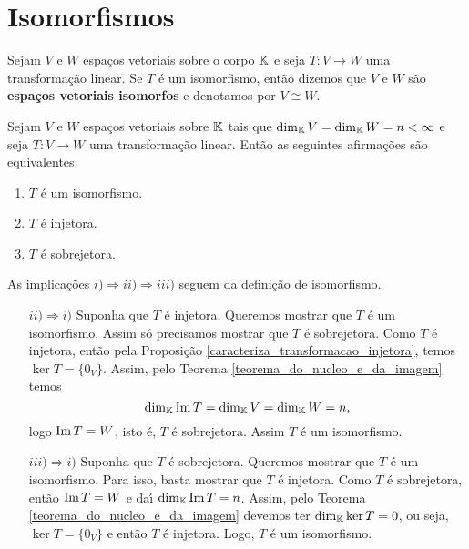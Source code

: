 \section{Isomorfismos}

\begin{definicao}
  Sejam $V$ e $W$ espa\c{c}os vetoriais sobre o corpo $\mathbb{K}$ e seja $T : V \to W$ uma transforma\c{c}\~ao linear. Se $T$ \'e um isomorfismo, ent\~ao dizemos que $V$ e $W$ s\~ao \textbf{espa\c{c}os vetoriais isomorfos} e denotamos por $V \cong W$.
\end{definicao}

\begin{proposicao}\label{equivalencia_isomorfismo_dimensao_finita}
  Sejam $V$ e $W$ espa\c{c}os vetoriais sobre $\mathbb{K}$ tais que $\dim_{\mathbb{K}}V = \dim_{\mathbb{K}}W = n < \infty$ e seja $T : V \to W$ uma transforma\c{c}\~ao linear. Ent\~ao as seguintes afirma\c{c}\~oes s\~ao equivalentes:
  \begin{enumerate}[label={\roman*})]
    \item $T$ \'e um isomorfismo.
    \item $T$ \'e injetora.
    \item $T$ \'e sobrejetora.
  \end{enumerate}
\end{proposicao}
\begin{prova}
  As implica\c{c}\~oes $i) \Rightarrow ii) \Rightarrow iii)$ seguem da defini\c{c}\~ao de isomorfismo.
  \begin{enumerate}
    \item[$ii) \Rightarrow i)$] Suponha que $T$ \'e injetora. Queremos mostrar que $T$ \'e um isomorfismo. Assim s\'o precisamos mostrar que $T$ \'e sobrejetora. Como $T$ \'e injetora, ent\~ao pela Proposi\c{c}\~ao \ref{caracteriza_transformacao_injetora}, temos $\ker T = \{0_V\}$. Assim, pelo Teorema \ref{teorema_do_nucleo_e_da_imagem} temos
    \[
      \dim_{\mathbb{K}}{\rm Im\,} T = \dim_{\mathbb{K}}V = \dim_{\mathbb{K}}W = n,
    \]
    logo ${\rm Im\,} T = W$, isto \'e, $T$ \'e sobrejetora. Assim $T$ \'e um isomorfismo.

    \item[$iii) \Rightarrow i)$] Suponha que $T$ \'e sobrejetora. Queremos mostrar que $T$ \'e um isomorfismo. Para isso, basta mostrar que $T$ \'e injetora. Como $T$ \'e sobrejetora, ent\~ao ${\rm Im\,} T = W$ e da{\'\i} $\dim_{\mathbb{K}}{\rm Im\,} T = n$. Assim, pelo Teorema \ref{teorema_do_nucleo_e_da_imagem} devemos ter $\dim_{\mathbb{K}}\ker T = 0$, ou seja, $\ker T = \{0_V\}$ e ent\~ao $T$ \'e injetora. Logo, $T$ \'e um isomorfismo.
  \end{enumerate}
\end{prova}


